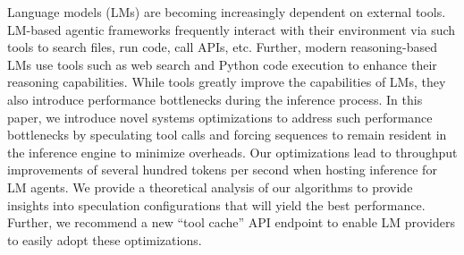 Language models (LMs) are becoming increasingly dependent on external tools.
LM-based agentic frameworks frequently interact with their environment via such
tools to search files, run code, call APIs, etc. Further, modern
reasoning-based LMs use tools such as web search and Python code execution to
enhance their reasoning capabilities. While tools greatly improve the
capabilities of LMs, they also introduce performance bottlenecks during the
inference process. 
In this paper, we introduce novel systems optimizations to address such
performance bottlenecks by speculating tool calls and forcing sequences to
remain resident in the inference engine to minimize overheads.  Our
optimizations lead to throughput improvements of several hundred tokens per
second when hosting inference for LM agents. 
We provide a theoretical analysis of our algorithms to provide insights
into speculation configurations that will yield the best performance.
Further, we recommend a new ``tool cache'' API endpoint to enable LM providers to easily adopt these
optimizations.

